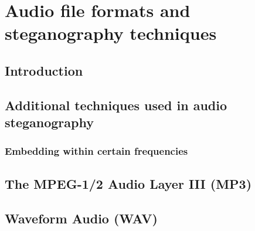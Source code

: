 
\chapter{Audio file formats and steganography techniques}

\section{Introduction}

\section{Additional techniques used in audio steganography}
\subsection{Embedding within certain frequencies}

\section{The MPEG-1/2 Audio Layer III (MP3)}

\section{Waveform Audio (WAV)}